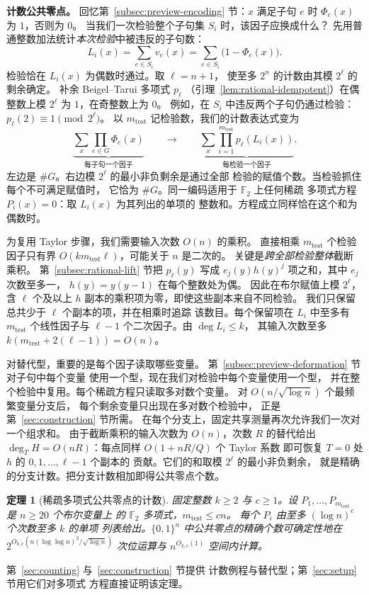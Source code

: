 \documentclass[11pt,reqno]{amsart}
\numberwithin{equation}{section}
\newtheorem{theorem}{定理}[section]
\theoremstyle{definition}\newtheorem{definition}[theorem]{定义}
\theoremstyle{remark}\newtheorem{remark}[theorem]{注}
\renewcommand{\le}{\leqslant}
\renewcommand{\ge}{\geqslant}
\begin{document}
\medskip\noindent
\textbf{计数公共零点。}
回忆第~\ref{subsec:preview-encoding} 节：$x$ 满足子句
$e$ 时 $\Phi_e(x)$ 为 $1$，否则为 $0$。
当我们一次检验整个子句集 $S_i$ 时，该因子应换成什么？
先用普通整数加法统计\emph{本次检验}中被违反的子句数：
\[
 L_i(x)=\sum_{e\in S_i}v_e(x)=\sum_{e\in S_i}\bigl(1-\Phi_e(x)\bigr).
\]
检验恰在 $L_i(x)$ 为偶数时通过。取 $\ell=n+1$，
使至多 $2^n$ 的计数由其模 $2^\ell$ 的剩余确定。
补余 Beigel--Tarui 多项式 $p_\ell$
（引理~\ref{lem:rational-idempotent}）在偶整数上模
$2^\ell$ 为 $1$，在奇整数上为 $0$。
例如，在 $S_i$ 中违反两个子句仍通过检验：
$p_\ell(2)\equiv1\pmod{2^\ell}$。
以 $m_{\mathrm{test}}$ 记检验数，我们的计数表达式变为
\[
 \underbrace{\sum_x\prod_{e\in G}\Phi_e(x)}_{\text{每子句一个因子}}
 \qquad\longrightarrow\qquad
 \underbrace{\sum_x\prod_{i=1}^{m_{\mathrm{test}}} p_\ell(L_i(x))}_{\text{每检验一个因子}}.
\]
左边是 $\#G$。右边模 $2^\ell$ 的最小非负剩余是通过全部
检验的赋值个数。当检验抓住每个不可满足赋值时，
它恰为 $\#G$。同一编码适用于 $\mathbb F_2$ 上任何稀疏
多项式方程 $P_i(x)=0$：取 $L_i(x)$ 为其列出的单项的
整数和。方程成立同样恰在这个和为偶数时。

为复用 Taylor 步骤，我们需要输入次数 $O(n)$ 的乘积。
直接相乘 $m_{\mathrm{test}}$ 个检验因子只有界
$O(km_{\mathrm{test}}\ell)$，可能关于 $n$ 是二次的。
关键是\emph{跨全部检验整体}截断乘积。
第~\ref{subsec:rational-lift} 节把 $p_\ell(y)$ 写成
$e_j(y)h(y)^j$ 项之和，其中 $e_j$ 次数至多一，
$h(y)=y(y-1)$ 在每个整数处为偶。
因此在布尔赋值上模 $2^\ell$，含 $\ell$ 个及以上 $h$
副本的乘积项为零，即使这些副本来自不同检验。
我们只保留总共少于 $\ell$ 个副本的项，并在相乘时追踪
该数目。每个保留项在 $L_i$ 中至多有 $m_{\mathrm{test}}$
个线性因子与 $\ell-1$ 个二次因子。由 $\deg L_i\le k$，
其输入次数至多 $k(m_{\mathrm{test}}+2(\ell-1))=O(n)$。

对替代型，重要的是每个因子读取哪些变量。
第~\ref{subsec:preview-deformation} 节对子句中每个变量
使用一个型，现在我们对检验中每个变量使用一个型，
并在整个检验中复用。每个稀疏方程只读取多对数个变量。
对 $O(n/\sqrt{\log n})$ 个最频繁变量分支后，
每个剩余变量只出现在多对数个检验中，
正是第~\ref{sec:construction} 节所需。
在每个分支上，固定共享测量再次允许我们一次对一个组求和。
由于截断乘积的输入次数为 $O(n)$，次数 $R$ 的替代给出
$\deg_T H=O(nR)$：每点同样 $O(1+nR/Q)$ 个 Taylor 系数
即可恢复 $T=0$ 处 $h$ 的 $0,1,\ldots,\ell-1$ 个副本的
贡献。它们的和取模 $2^\ell$ 的最小非负剩余，
就是精确的分支计数。把分支计数相加即得公共零点个数。

\begin{theorem}[稀疏多项式公共零点的计数]
\label{thm:overview-sparse-polynomials}
固定整数 $k\ge2$ 与 $c\ge1$。设
$P_1,\ldots,P_{m_{\mathrm{test}}}$ 是 $n\ge20$ 个布尔变量上
的 $\mathbb F_2$ 多项式，$m_{\mathrm{test}}\le cn$。
每个 $P_i$ 由至多 $(\log n)^c$ 个次数至多 $k$ 的单项
列表给出。$\{0,1\}^n$ 中公共零点的精确个数可确定性地在
$2^{O_{k,c}(n(\log\log n)^2/\sqrt{\log n})}$ 次位运算与
$n^{O_{k,c}(1)}$ 空间内计算。
\end{theorem}
第~\ref{sec:counting} 与~\ref{sec:construction} 节提供
计数例程与替代型；第~\ref{sec:setup} 节用它们对多项式
方程直接证明该定理。
\end{document}
